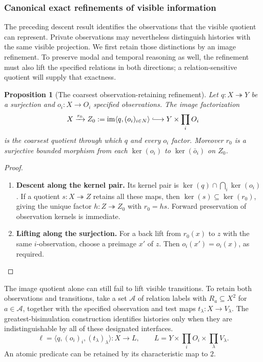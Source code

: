 \documentclass[11pt,a4paper]{article}
\numberwithin{equation}{section}
\newtheorem{proposition}[theorem]{Proposition}
\theoremstyle{definition}
\theoremstyle{remark}
\theoremstyle{plain}
\begin{document}
\subsubsection{Canonical exact refinements of visible information}
\label{sec:egt-exact-visible-refinement}

The preceding descent result identifies the observations that the
visible quotient can represent. Private observations may nevertheless
distinguish histories with the same visible projection. We first
retain those distinctions by an image refinement. To preserve modal
and temporal reasoning as well, the refinement must also lift the
specified relations in both directions; a relation-sensitive quotient
will supply that exactness.

\begin{proposition}[The coarsest observation-retaining refinement]
\label{prop:egt-observation-retaining-refinement}
Let $q:X\twoheadrightarrow Y$ be a surjection and $o_i:X\to O_i$
specified observations. The image factorization
\[
 X\xrightarrow{r_0}Z_0:=\operatorname{im}\langle q,(o_i)_{i\in N}\rangle
 \lhook\joinrel\longrightarrow Y\times\prod_iO_i
\]
is the coarsest quotient through which $q$ and every $o_i$ factor.
Moreover $r_0$ is a surjective bounded morphism from each $\ker(o_i)$
to $\ker(\bar o_i)$ on $Z_0$.
\end{proposition}
\begin{proof}
\leavevmode
\begin{enumerate}[label=\textup{(\arabic*)},leftmargin=*,itemsep=4pt,topsep=3pt]
  \item \textbf{Descent along the kernel pair.} Its kernel pair is $\ker(q)\cap\bigcap_i\ker(o_i)$. If a quotient
$s:X\twoheadrightarrow Z$ retains all these maps, then
$\ker(s)\subseteq\ker(r_0)$, giving the unique factor
$h:Z\twoheadrightarrow Z_0$ with $r_0=hs$. Forward preservation of observation kernels is immediate.
  \item \textbf{Lifting along the surjection.} For a back lift
from $r_0(x)$ to $z$ with the same $i$-observation, choose a preimage
$x'$ of $z$. Then $o_i(x')=o_i(x)$, as required.
\end{enumerate}
\end{proof}

The image quotient alone can still fail to lift visible
transitions. To retain both observations and transitions, take a set
$\mathcal A$ of relation labels with $R_a\subseteq X^2$ for
$a\in\mathcal A$, together with the specified observation and test
maps $t_\lambda:X\to V_\lambda$. The greatest-bisimulation
construction identifies histories only when they are indistinguishable
by all of these designated interfaces.
\[
 \ell=\langle q,(o_i)_i,(t_\lambda)_\lambda\rangle:X\to L,
 \qquad L=Y\times\prod_iO_i\times\prod_\lambda V_\lambda.
\]
An atomic predicate can be retained by its characteristic map to $2$.
\end{document}
